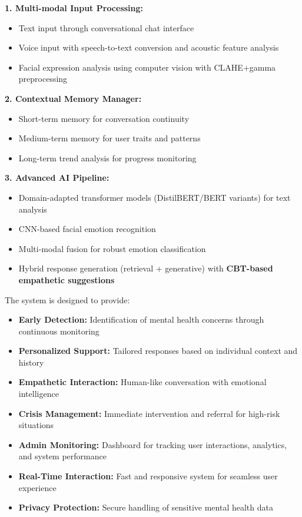 \documentclass[11pt]{report}
\begin{document}
\textbf{1. Multi-modal Input Processing:}
\begin{itemize}
    \item Text input through conversational chat interface
    \item Voice input with speech-to-text conversion and acoustic feature analysis
    \item Facial expression analysis using computer vision with CLAHE+gamma preprocessing
\end{itemize}

\textbf{2. Contextual Memory Manager:}
\begin{itemize}
    \item Short-term memory for conversation continuity
    \item Medium-term memory for user traits and patterns
    \item Long-term trend analysis for progress monitoring
\end{itemize}

\textbf{3. Advanced AI Pipeline:}
\begin{itemize}
    \item Domain-adapted transformer models (DistilBERT/BERT variants) for text analysis
    \item CNN-based facial emotion recognition
    \item Multi-modal fusion for robust emotion classification
    \item Hybrid response generation (retrieval + generative) with \textbf{CBT-based empathetic suggestions}
\end{itemize}

The system is designed to provide:
\begin{itemize}
    \item \textbf{Early Detection:} Identification of mental health concerns through continuous monitoring
    \item \textbf{Personalized Support:} Tailored responses based on individual context and history
    \item \textbf{Empathetic Interaction:} Human-like conversation with emotional intelligence
    \item \textbf{Crisis Management:} Immediate intervention and referral for high-risk situations
    \item \textbf{Admin Monitoring:} Dashboard for tracking user interactions, analytics, and system performance
    \item \textbf{Real-Time Interaction:} Fast and responsive system for seamless user experience
    \item \textbf{Privacy Protection:} Secure handling of sensitive mental health data
\end{itemize}
\end{document}
